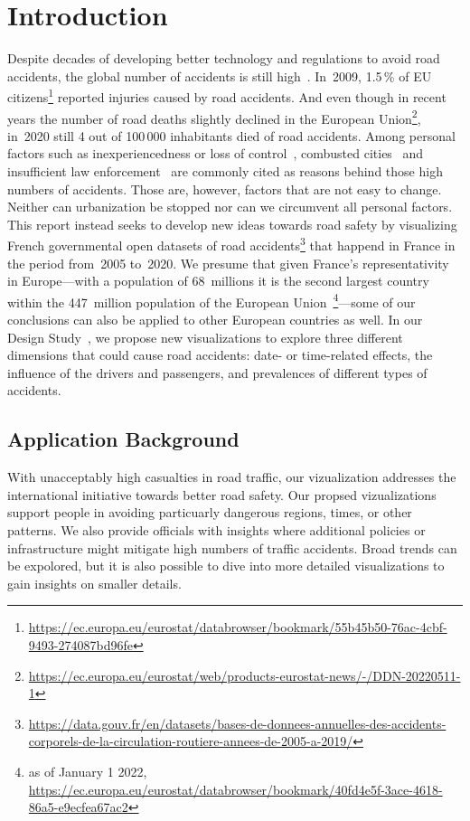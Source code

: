 \section{Introduction}
\label{introduction}
Despite decades of developing better technology and regulations to avoid road accidents, the global number of accidents is still high~\cite{Who2015}. In~2009, 1.5\,\% of EU citizens\footnote{\url{https://ec.europa.eu/eurostat/databrowser/bookmark/55b45b50-76ac-4cbf-9493-274087bd96fe}} reported injuries caused by road accidents. And even though in recent years the number of road deaths slightly declined in the European Union\footnote{\url{https://ec.europa.eu/eurostat/web/products-eurostat-news/-/DDN-20220511-1}}, in~2020 still 4 out of 100\,000 inhabitants died of road accidents. Among personal factors such as inexperiencedness or loss of control~\cite{RolisonRMF2018}, combusted cities~\cite{AlbalateF2021} and insufficient law enforcement~\cite{Who2015} are commonly cited as reasons behind those high numbers of accidents. Those are, however, factors that are not easy to change. Neither can urbanization be stopped nor can we circumvent all personal factors. This report instead seeks to develop new ideas towards road safety by visualizing French governmental open datasets of road accidents\footnote{\url{https://data.gouv.fr/en/datasets/bases-de-donnees-annuelles-des-accidents-corporels-de-la-circulation-routiere-annees-de-2005-a-2019/}} that happend in France in the period from~2005 to~2020. We presume that given France's representativity in Europe---with a population of 68~millions it is the second largest country within the 447~million population of the European Union~\footnote{as of January 1 2022, \url{https://ec.europa.eu/eurostat/databrowser/bookmark/40fd4e5f-3ace-4618-86a5-e9ecfea67ac2}}---some of our conclusions can also be applied to other European countries as well. In our Design Study~\cite{Munzner2008}, we propose new visualizations to explore three different dimensions that could cause road accidents: \Ni date- or time-related effects, \Nii the influence of the drivers and passengers, and \Niii prevalences of different types of accidents.

\subsection{Application Background}
With unacceptably high casualties in road traffic, our vizualization addresses the international initiative towards better road safety. Our propsed vizualizations support people in avoiding particuarly dangerous regions, times, or other patterns. We also provide officials with insights where additional policies or infrastructure might mitigate high numbers of traffic accidents. Broad trends can be expolored, but it is also possible to dive into more detailed visualizations to gain insights on smaller details.

